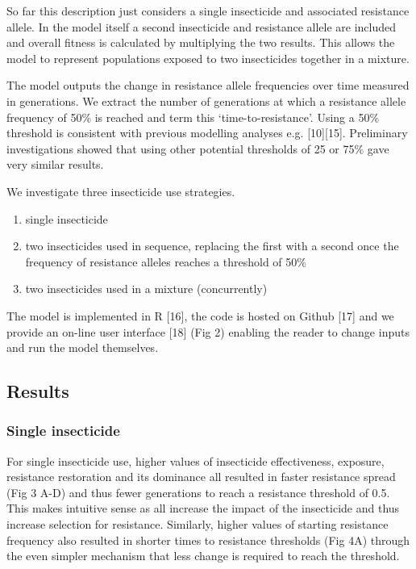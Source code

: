 \documentclass[11pt,]{article}
\providecommand{\tightlist}{%
  \setlength{\itemsep}{0pt}\setlength{\parskip}{0pt}}
\begin{document}
So far this description just considers a single insecticide and
associated resistance allele. In the model itself a second insecticide
and resistance allele are included and overall fitness is calculated by
multiplying the two results. This allows the model to represent
populations exposed to two insecticides together in a mixture.

The model outputs the change in resistance allele frequencies over time
measured in generations. We extract the number of generations at which a
resistance allele frequency of 50\% is reached and term this
`time-to-resistance'. Using a 50\% threshold is consistent with previous
modelling analyses e.g. {[}10{]}{[}15{]}. Preliminary investigations
showed that using other potential thresholds of 25 or 75\% gave very
similar results.

We investigate three insecticide use strategies.

\begin{enumerate}
\def\labelenumi{\arabic{enumi}.}
\tightlist
\item
  single insecticide
\item
  two insecticides used in sequence, replacing the first with a second
  once the frequency of resistance alleles reaches a threshold of 50\%
\item
  two insecticides used in a mixture (concurrently)
\end{enumerate}

The model is implemented in R {[}16{]}, the code is hosted on Github
{[}17{]} and we provide an on-line user interface {[}18{]} (Fig 2)
enabling the reader to change inputs and run the model themselves.

\subsection{Results}\label{results-1}

\subsubsection{Single insecticide}\label{single-insecticide}

For single insecticide use, higher values of insecticide effectiveness,
exposure, resistance restoration and its dominance all resulted in
faster resistance spread (Fig 3 A-D) and thus fewer generations to reach
a resistance threshold of 0.5. This makes intuitive sense as all
increase the impact of the insecticide and thus increase selection for
resistance. Similarly, higher values of starting resistance frequency
also resulted in shorter times to resistance thresholds (Fig 4A) through
the even simpler mechanism that less change is required to reach the
threshold.
\end{document}
